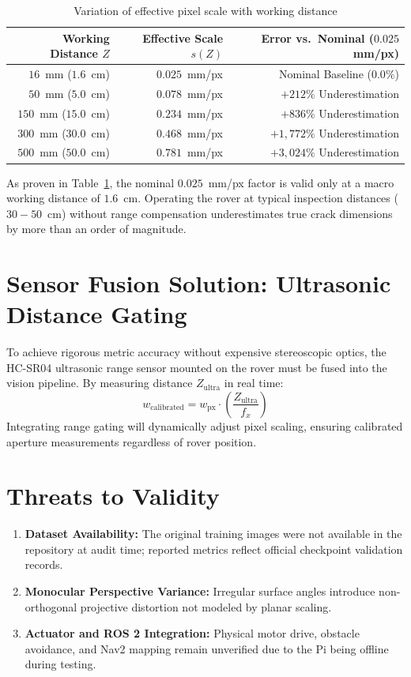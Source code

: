 \documentclass[12pt,a4paper,oneside]{report}
\begin{document}
\begin{table}[htbp]
\caption{Variation of effective pixel scale with working distance}
\label{tab:distance_scale}
\centering
\begin{tabular}{rrr}
\toprule
\textbf{Working Distance $Z$} & \textbf{Effective Scale $s(Z)$} & \textbf{Error vs.\ Nominal ($0.025$ mm/px)}\\
\midrule
$16$~mm ($1.6$~cm) & $0.025$~mm/px & Nominal Baseline ($0.0\%$)\\
$50$~mm ($5.0$~cm) & $0.078$~mm/px & $+212\%$ Underestimation\\
$150$~mm ($15.0$~cm) & $0.234$~mm/px & $+836\%$ Underestimation\\
$300$~mm ($30.0$~cm) & $0.468$~mm/px & $+1,772\%$ Underestimation\\
$500$~mm ($50.0$~cm) & $0.781$~mm/px & $+3,024\%$ Underestimation\\
\bottomrule
\end{tabular}
\end{table}

As proven in Table~\ref{tab:distance_scale}, the nominal $0.025$~mm/px factor is valid only at a macro working distance of $1.6$~cm. Operating the rover at typical inspection distances ($30-50$~cm) without range compensation underestimates true crack dimensions by more than an order of magnitude.

\section{Sensor Fusion Solution: Ultrasonic Distance Gating}
To achieve rigorous metric accuracy without expensive stereoscopic optics, the HC-SR04 ultrasonic range sensor mounted on the rover must be fused into the vision pipeline. By measuring distance $Z_{\text{ultra}}$ in real time:
\begin{equation}
w_{\text{calibrated}} = w_{\text{px}} \cdot \left( \frac{Z_{\text{ultra}}}{f_x} \right)
\end{equation}
Integrating range gating will dynamically adjust pixel scaling, ensuring calibrated aperture measurements regardless of rover position.

\section{Threats to Validity}
\begin{enumerate}
  \item \textbf{Dataset Availability:} The original training images were not available in the repository at audit time; reported metrics reflect official checkpoint validation records.
  \item \textbf{Monocular Perspective Variance:} Irregular surface angles introduce non-orthogonal projective distortion not modeled by planar scaling.
  \item \textbf{Actuator and ROS 2 Integration:} Physical motor drive, obstacle avoidance, and Nav2 mapping remain unverified due to the Pi being offline during testing.
\end{enumerate}
\end{document}
